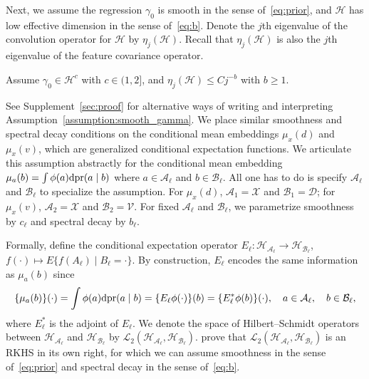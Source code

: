 
Next, we assume the regression $\gamma_0$ is smooth in the sense of~\eqref{eq:prior}, and $\mathcal{H}$ has low effective dimension in the sense of~\eqref{eq:b}. Denote the $j$th eigenvalue of the convolution operator for $\mathcal{H}$ by $\eta_j(\mathcal{H})$. Recall that $\eta_j(\mathcal{H})$ is also the $j$th eigenvalue of the feature covariance operator.
\begin{assumption}\label{assumption:smooth_gamma}
Assume $\gamma_0\in\mathcal{H}^c$ with $c\in(1,2]$, and $\eta_j(\mathcal{H})\leq C j^{-b}$ with $b\geq 1$.
\end{assumption}
See Supplement~\ref{sec:proof} for alternative ways of writing and interpreting Assumption~\ref{assumption:smooth_gamma}. We place similar smoothness and spectral decay conditions on the conditional mean embeddings $\mu_x(d)$ and $\mu_x(v)$,  which are generalized conditional expectation functions. We articulate this assumption abstractly for the conditional mean embedding $\mu_{a}(b)=\int \phi(a)\mathrm{d}\text{\normalfont pr}(a \mid b)$ where $a\in\mathcal{A}_{\ell}$ and $b\in\mathcal{B}_{\ell}$. All one has to do is specify $\mathcal{A}_{\ell}$ and $\mathcal{B}_{\ell}$ to specialize the assumption. For $\mu_x(d)$, $\mathcal{A}_1=\mathcal{X}$ and $\mathcal{B}_1=\mathcal{D}$; for $\mu_x(v)$, $\mathcal{A}_2=\mathcal{X}$ and $\mathcal{B}_2=\mathcal{V}$. For fixed $\mathcal{A}_{\ell}$ and $\mathcal{B}_{\ell}$, we parametrize smoothness by $c_{\ell}$ and spectral decay by $b_{\ell}$.

Formally, define the conditional expectation operator $E_{\ell}:\mathcal{H}_{\mathcal{A}_{\ell}}\rightarrow\mathcal{H}_{\mathcal{B}_{\ell}}$, $f(\cdot)\mapsto E\{f(A_{\ell}) \mid B_{\ell}=\cdot\}$. By construction, $E_{\ell}$ encodes the same information as $\mu_{a}(b)$ since
$$
\{\mu_{a}(b)\}(\cdot)=\int \phi(a)\mathrm{d}\text{\normalfont pr}(a \mid b) =\{E_{\ell}\phi(\cdot)\}(b) =\{E_{\ell}^* \phi(b)\}(\cdot),\quad a\in\mathcal{A}_{\ell}, \quad b\in\mathcal{B}_{\ell},
$$
where $E_{\ell}^*$ is the adjoint of $E_{\ell}$. We denote the space of Hilbert--Schmidt operators between $\mathcal{H}_{\mathcal{A}_{\ell}}$ and $\mathcal{H}_{\mathcal{B}_{\ell}}$ by $\mathcal{L}_2(\mathcal{H}_{\mathcal{A}_{\ell}},\mathcal{H}_{\mathcal{B}_{\ell}})$. \cite{grunewalder2013smooth,singh2019kernel} prove that $\mathcal{L}_2(\mathcal{H}_{\mathcal{A}_{\ell}},\mathcal{H}_{\mathcal{B}_{\ell}})$ is an RKHS in its own right, for which we can assume smoothness in the sense of~\eqref{eq:prior} and spectral decay in the sense of~\eqref{eq:b}.

